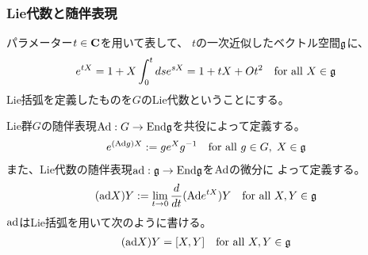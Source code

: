 {\subsubsection{Lie代数と随伴表現}\label{s3:Lie代数と随伴表現} %
	パラメーター$t\in\mathbf{C}$を用いて表して、
	$t$の一次近似したベクトル空間$\mathfrak{g}$に、
	\begin{equation*}\begin{split}
		e^{tX} = 1 + X\int_0^tdse^{sX} = 1 + tX + Ot^2
		\quad\text{for all } X\in\mathfrak{g}
	\end{split}\end{equation*}
	Lie括弧を定義したものを$G$のLie代数ということにする。

	Lie群$G$の随伴表現${\operatorname{Ad}}:G\to{\ensuremath{\operatorname{End}}}\mathfrak{g}$を共役によって定義する。
	\begin{equation*}\begin{split}
		e^{({\operatorname{Ad}} g)X} := ge^Xg^{-1} \quad\text{for all } g\in G,\; X\in\mathfrak{g}
	\end{split}\end{equation*}
	また、Lie代数の随伴表現${\operatorname{ad}}:\mathfrak{g}\to{\ensuremath{\operatorname{End}}}\mathfrak{g}$を${\operatorname{Ad}}$の微分に
	よって定義する。
	\begin{equation*}\begin{split}
		({\operatorname{ad}} X)Y := \lim_{t\to0}\frac{d}{dt}({\operatorname{Ad}} e^{tX})Y
		\quad\text{for all } X,Y\in\mathfrak{g}
	\end{split}\end{equation*}
	${\operatorname{ad}}$はLie括弧を用いて次のように書ける。
	\begin{equation*}\begin{split}
		({\operatorname{ad}} X)Y = [X, Y] \quad\text{for all } X,Y\in\mathfrak{g}
	\end{split}\end{equation*}

}
